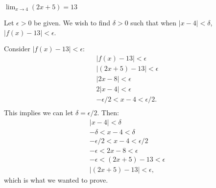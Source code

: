 {$\displaystyle \lim_{x\to 4} (2x+5) = 13$}
{Let $\epsilon >0$ be given. We wish to find $\delta >0$ such that when $|x-4|<\delta$, $|f(x)-13|<\epsilon$. 

Consider $|f(x)-13|<\epsilon$:
\begin{gather*}
|f(x) -13 | < \epsilon \\
|(2x+5)-13 |<\epsilon \\
| 2x-8 | < \epsilon \\
2| x-4 | < \epsilon \\
-\epsilon/2 < x-4 < \epsilon/2. \\
\end{gather*}
This implies we can let $\delta =\epsilon/2$. Then:
\begin{gather*}
|x-4|<\delta \\
-\delta < x-4 < \delta\\
-\epsilon/2 < x-4 < \epsilon/2\\
-\epsilon < 2x-8 < \epsilon \\
-\epsilon < (2x+5)-13 < \epsilon \\
|(2x+5) - 13| < \epsilon,
\end{gather*}
which is what we wanted to prove.
}

